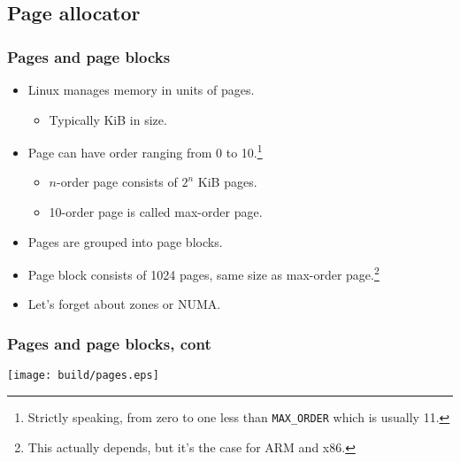 \subsection{Page allocator}

\begin{frame}[fragile]
  \frametitle{Pages and page blocks}

  \begin{itemize}
  \item Linux manages memory in units of pages.
    \begin{itemize}
    \item Typically \unit[4]{KiB} in size.
    \end{itemize}
  \item Page can have order ranging from 0 to 10.\footnote{Strictly
    speaking, from zero to one less than \lstinline|MAX_ORDER| which is
    usually 11.}
    \begin{itemize}
    \item $n$-order page consists of $2^n$ \unit[4]{KiB} pages.
    \item 10-order page is called max-order page.
    \end{itemize}
  \item Pages are grouped into page blocks.
  \item Page block consists of 1024 pages, same size as max-order
    page.\footnote{This actually depends, but it's the case for ARM
      and x86.}
  \item {\footnotesize Let's forget about zones or NUMA.}
  \end{itemize}
\end{frame}

\begin{frame}
  \frametitle{Pages and page blocks, cont}
  \begin{center}
  \texttt{[image: build/pages.eps]}
  \end{center}
\end{frame}

